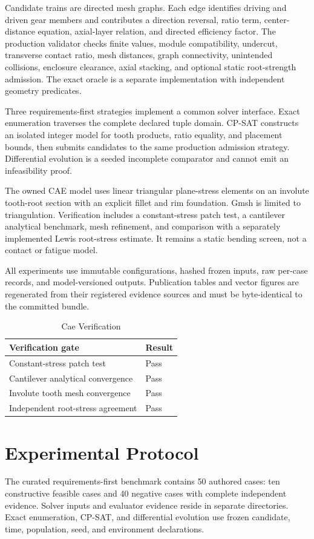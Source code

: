 \documentclass[preprint,12pt]{elsarticle}
\begin{document}
Candidate trains are directed mesh graphs. Each edge identifies driving and driven gear members and contributes a direction reversal, ratio term, center-distance equation, axial-layer relation, and directed efficiency factor. The production validator checks finite values, module compatibility, undercut, transverse contact ratio, mesh distances, graph connectivity, unintended collisions, enclosure clearance, axial stacking, and optional static root-strength admission. The exact oracle is a separate implementation with independent geometry predicates.

Three requirements-first strategies implement a common solver interface. Exact enumeration traverses the complete declared tuple domain. CP-SAT constructs an isolated integer model for tooth products, ratio equality, and placement bounds, then submits candidates to the same production admission strategy. Differential evolution is a seeded incomplete comparator and cannot emit an infeasibility proof.

The owned CAE model uses linear triangular plane-stress elements on an involute tooth-root section with an explicit fillet and rim foundation. Gmsh is limited to triangulation. Verification includes a constant-stress patch test, a cantilever analytical benchmark, mesh refinement, and comparison with a separately implemented Lewis root-stress estimate. It remains a static bending screen, not a contact or fatigue model.

All experiments use immutable configurations, hashed frozen inputs, raw per-case records, and model-versioned outputs. Publication tables and vector figures are regenerated from their registered evidence sources and must be byte-identical to the committed bundle.

\begin{table}[htbp]
\centering
\caption{Cae Verification}
\small
\begin{tabular}{ll}
\textbf{Verification gate} & \textbf{Result} \\
\hline
Constant-stress patch test & Pass \\
Cantilever analytical convergence & Pass \\
Involute tooth mesh convergence & Pass \\
Independent root-stress agreement & Pass \\
\end{tabular}
\end{table}
\section{Experimental Protocol}
The curated requirements-first benchmark contains 50 authored cases: ten constructive feasible cases and 40 negative cases with complete independent evidence. Solver inputs and evaluator evidence reside in separate directories. Exact enumeration, CP-SAT, and differential evolution use frozen candidate, time, population, seed, and environment declarations.
\end{document}
